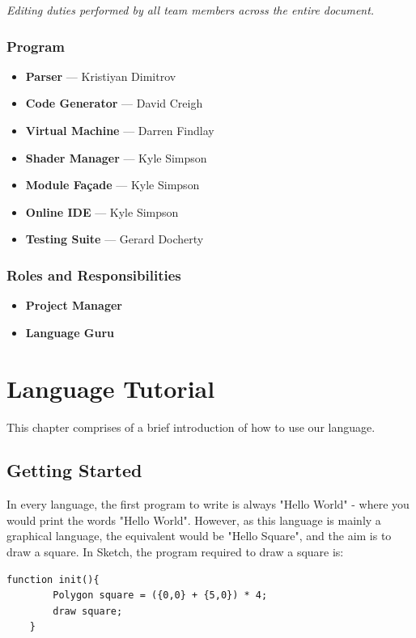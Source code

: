 \documentclass{l3proj}
\begin{document}
\textit{Editing duties performed by all team members across the entire document.}
\subsection{Program}
\label{cont-prog}
\begin{itemize}
\item \textbf{Parser} --- Kristiyan Dimitrov
\item \textbf{Code Generator} --- David Creigh
\item \textbf{Virtual Machine} --- Darren Findlay
\item \textbf{Shader Manager} --- Kyle Simpson
\item \textbf{Module Fa\c{c}ade} --- Kyle Simpson
\item \textbf{Online IDE} --- Kyle Simpson
\item \textbf{Testing Suite} --- Gerard Docherty
\end{itemize}
\subsection{Roles and Responsibilities}
\label{cont-prog}
\begin{itemize}
\item \textbf{Project Manager}
\item \textbf{Language Guru}
\end{itemize}

\appendix
\chapter{Language Tutorial}
\label{tut}
This chapter comprises of a brief introduction of how to use our language.
\section{Getting Started}
\label{start}
In every language, the first program to write is always "Hello World" - where you would print the words "Hello World". However, as this language is mainly a graphical language, the equivalent would be "Hello Square", and the aim is to draw a square. In Sketch, the program required to draw a square is:
\lstset{%
      basicstyle=\ttfamily\footnotesize\bfseries,
      xleftmargin=.1\textwidth, xrightmargin=.1\textwidth,
      captionpos=b,
      tabsize=4
    }
\begin{lstlisting}[caption={Hello Square},label={lst:tutorial-hello}]
    function init(){
        Polygon square = ({0,0} + {5,0}) * 4;
        draw square;
    }
\end{lstlisting}
\end{document}
